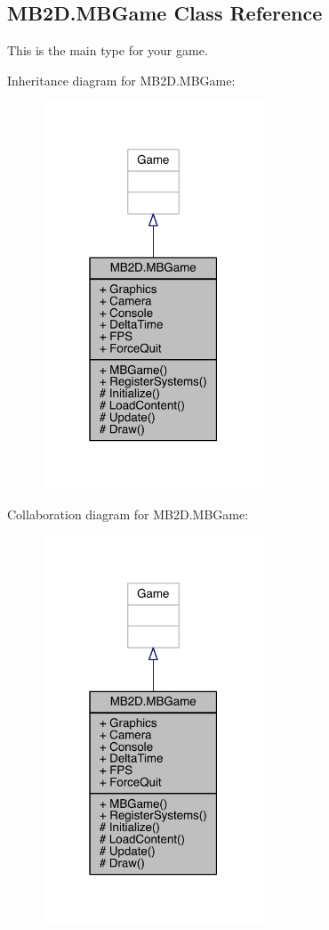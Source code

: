 \hypertarget{class_m_b2_d_1_1_m_b_game}{}\subsection{M\+B2\+D.\+M\+B\+Game Class Reference}
\label{class_m_b2_d_1_1_m_b_game}


This is the main type for your game.  




Inheritance diagram for M\+B2\+D.\+M\+B\+Game\+:
\nopagebreak
\begin{figure}[H]
\begin{center}
\leavevmode
\includegraphics[width=187pt]{class_m_b2_d_1_1_m_b_game__inherit__graph}
\end{center}
\end{figure}


Collaboration diagram for M\+B2\+D.\+M\+B\+Game\+:
\nopagebreak
\begin{figure}[H]
\begin{center}
\leavevmode
\includegraphics[width=187pt]{class_m_b2_d_1_1_m_b_game__coll__graph}
\end{center}
\end{figure}
